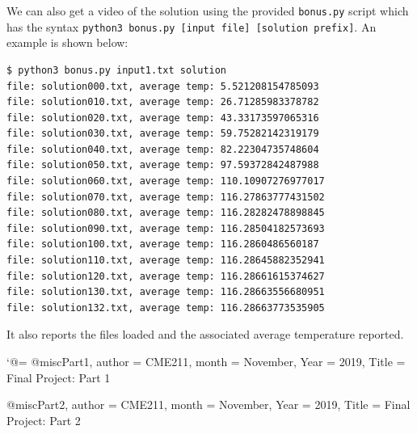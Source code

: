 \documentclass[10pt,a4paper]{article}
\makeatletter
\newenvironment{rezabib}
  {\bibdiv\biblist\setupbib}
  {\endbiblist\endbibdiv}
\def\setupbib{\catcode`@=\active}
\makeatother
\begin{document}
We can also get a video of the solution using the provided \texttt{bonus.py} script which has the syntax \texttt{python3 bonus.py [input file] [solution prefix]}. An example is shown below:
\begin{verbatim}
$ python3 bonus.py input1.txt solution
file: solution000.txt, average temp: 5.521208154785093
file: solution010.txt, average temp: 26.71285983378782
file: solution020.txt, average temp: 43.33173597065316
file: solution030.txt, average temp: 59.75282142319179
file: solution040.txt, average temp: 82.22304735748604
file: solution050.txt, average temp: 97.59372842487988
file: solution060.txt, average temp: 110.10907276977017
file: solution070.txt, average temp: 116.27863777431502
file: solution080.txt, average temp: 116.28282478898845
file: solution090.txt, average temp: 116.28504182573693
file: solution100.txt, average temp: 116.2860486560187
file: solution110.txt, average temp: 116.28645882352941
file: solution120.txt, average temp: 116.28661615374627
file: solution130.txt, average temp: 116.28663556680951
file: solution132.txt, average temp: 116.28663773535905
\end{verbatim}
It also reports the files loaded and the associated average temperature reported.

\begin{rezabib}
@misc{Part1,
    author  = {CME211},
    month = {November},
    Year = {2019},
    Title = {Final Project: Part 1}
}

@misc{Part2,
    author  = {CME211},
    month = {November},
    Year = {2019},
    Title = {Final Project: Part 2}
}
\end{rezabib}
\end{document}
